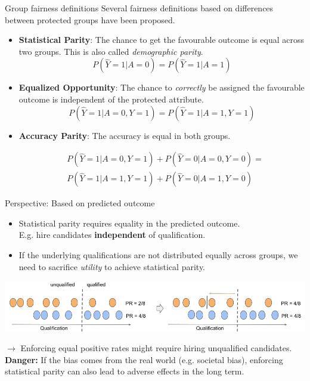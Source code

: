 \documentclass[11pt,compress,t,notes=noshow, xcolor=table]{beamer}
\begin{document}
\begin{vbframe}{Group fairness definitions}
  Several fairness definitions based on differences between protected groups have been proposed.
  \begin{itemize}
    \item \textbf{Statistical Parity}: The chance to get the favourable outcome is equal across two groups. This is also 
          called \textit{demographic parity}.
          \[
          P(\hat{Y} = 1 | A = 0) = P(\hat{Y} = 1 | A = 1)   
          \]
    \item \textbf{Equalized Opportunity}: The chance to \emph{correctly} be assigned the favourable outcome is independent of 
          the protected attribute. 
          \[
            P(\hat{Y} = 1 | A = 0, Y = 1) = P(\hat{Y} = 1 | A = 1, Y = 1)   
          \]

    \item \textbf{Accuracy Parity}: The accuracy is equal in both groups.
    
    \[ \begin{aligned}
    & P(\hat{Y} = 1 | A = 0, Y = 1) + P(\hat{Y} = 0 | A = 0, Y = 0) = \\
    & P(\hat{Y} = 1 | A = 1, Y = 1) + P(\hat{Y} = 0 | A = 1, Y = 0)
    \end{aligned} \]
  \end{itemize}
\end{vbframe}

\begin{vbframe}{Perspective: Based on predicted outcome}
    \textbf{}
    \begin{itemize}
      \item Statistical parity requires equality in the predicted outcome.\\
      E.g. hire candidates \textbf{independent} of qualification.
      \item If the underlying qualifications are not distributed equally across groups, we need to sacrifice \emph{utility} to achieve statistical parity.
    \end{itemize}
    \begin{center}
      \includegraphics[]{figures/statistical_parity}
    \end{center}
    $\rightarrow$ Enforcing equal positive rates might require hiring unqualified candidates.\\
    \textbf{Danger:} If the bias comes from the real world (e.g. societal bias), enforcing statistical parity can also lead to adverse effects in the long term.
\end{vbframe}
\end{document}
